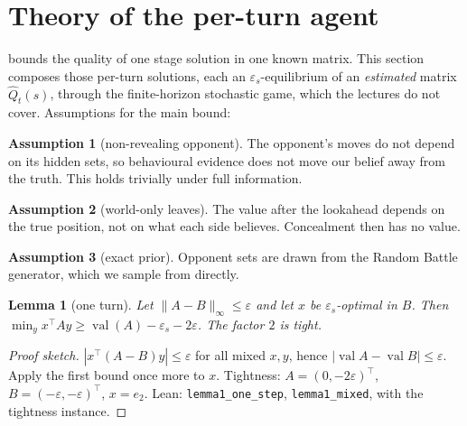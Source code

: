 \documentclass[10pt]{article}
\theoremstyle{plain}
\newtheorem{lemma}[theorem]{Lemma}
\theoremstyle{definition}
\newtheorem{assumption}{Assumption}
\theoremstyle{remark}
\newcommand{\epss}{\varepsilon_s}
\newcommand{\Qhat}{\hat Q}
\DeclareMathOperator{\val}{val}
\begin{document}
\section{Theory of the per-turn agent}
\label{sec:theory}
 bounds the quality of one stage solution in one known matrix. This section composes those per-turn solutions, each an $\epss$-equilibrium of an \emph{estimated} matrix $\Qhat_t(s)$, through the finite-horizon stochastic game, which the lectures do not cover. Assumptions for the main bound:
\begin{assumption}[non-revealing opponent]\label{asm:nonrev} The opponent's moves do not depend on its hidden sets, so behavioural evidence does not move our belief away from the truth. This holds trivially under full information.\end{assumption}
\begin{assumption}[world-only leaves]\label{asm:world} The value after the lookahead depends on the true position, not on what each side believes. Concealment then has no value.\end{assumption}
\begin{assumption}[exact prior]\label{asm:prior} Opponent sets are drawn from the Random Battle generator, which we sample from directly.\end{assumption}

\begin{lemma}[one turn]\label{lem:one}
Let $\lVert A-B\rVert_\infty\le\varepsilon$ and let $x$ be $\epss$-optimal in $B$. Then $\min_y x^\top Ay\ge\val(A)-\epss-2\varepsilon$. The factor $2$ is tight.
\end{lemma}
\begin{proof}[Proof sketch]
$|x^\top(A-B)y|\le\varepsilon$ for all mixed $x,y$, hence $|\val A-\val B|\le\varepsilon$. Apply the first bound once more to $x$. Tightness: $A=(0,-2\varepsilon)^\top$, $B=(-\varepsilon,-\varepsilon)^\top$, $x=e_2$. Lean: \texttt{lemma1\_one\_step}, \texttt{lemma1\_mixed}, with the tightness instance.
\end{proof}
\end{document}
